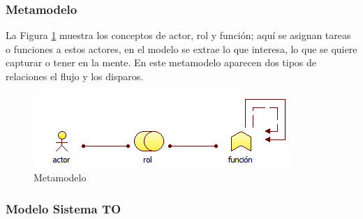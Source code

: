     \subsubsection{Metamodelo}
    La Figura \ref{metamodelo3} muestra los conceptos de actor, rol y función; aquí se asignan tareas o funciones a estos actores, en el modelo se extrae lo que interesa, lo que   se quiere capturar o tener en la mente. En este metamodelo aparecen dos tipos de relaciones el flujo y los disparos. \cite{ref9}
    \begin{figure}[h]
      \centering
      \includegraphics{Imagenes/Metamodelos/03}
      \caption{Metamodelo}
      \label{metamodelo3}
    \end{figure}
\subsubsection{Modelo Sistema TO}

